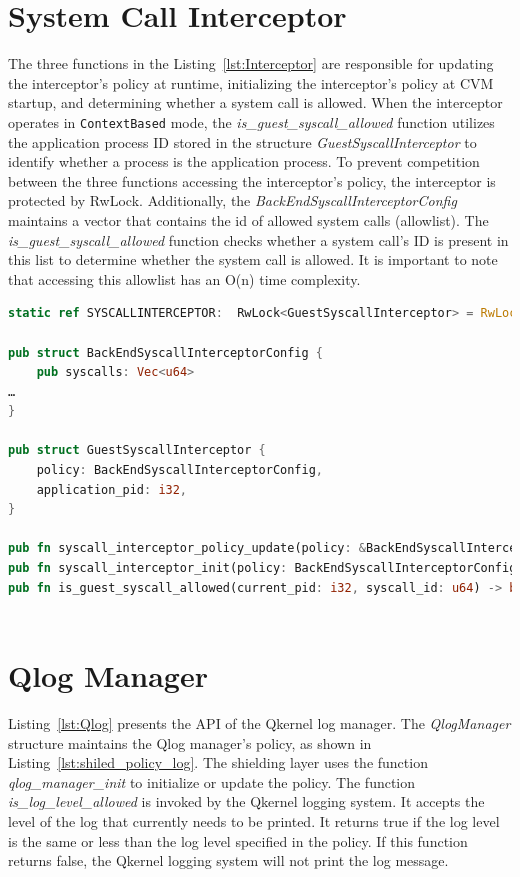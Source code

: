 \section{System Call Interceptor}
\label{sec:impl_interceptor}
The three functions in the Listing~\ref{lst:Interceptor} are responsible for updating the interceptor’s policy at runtime, initializing the interceptor’s policy at \acrshort{CVM} startup, and determining whether a system call is allowed. When the interceptor operates in \texttt{ContextBased} mode, 
the \emph{is\_guest\_syscall\_allowed} function utilizes the application process ID stored in the structure \emph{GuestSyscallInterceptor} to identify whether a process is the application process. To prevent competition between the three functions accessing the interceptor's policy, the interceptor is 
protected by RwLock. Additionally, the \emph{BackEndSyscallInterceptorConfig} maintains a vector that contains the id of allowed system calls (allowlist). The \emph{is\_guest\_syscall\_allowed} function checks whether a system call's ID is present in this list to determine whether the system call 
is allowed. It is important to note that accessing this allowlist has an O(n) time complexity.

\begin{lstlisting}[language=rust, caption= API of system call interceptor, label={lst:Interceptor}]
static ref SYSCALLINTERCEPTOR:  RwLock<GuestSyscallInterceptor> = RwLock::new(GuestSyscallInterceptor::default());

pub struct BackEndSyscallInterceptorConfig {
    pub syscalls: Vec<u64>
…
}

pub struct GuestSyscallInterceptor {
    policy: BackEndSyscallInterceptorConfig,
    application_pid: i32,
}

pub fn syscall_interceptor_policy_update(policy: &BackEndSyscallInterceptorConfig) -> Result<()> 
pub fn syscall_interceptor_init(policy: BackEndSyscallInterceptorConfig) -> Result<()> 
pub fn is_guest_syscall_allowed(current_pid: i32, syscall_id: u64) -> bool
    
\end{lstlisting}


\section{Qlog Manager}
\label{sec:iml_qlog}
Listing~\ref{lst:Qlog} presents the API of the Qkernel log manager. The \emph{QlogManager} structure maintains the Qlog manager's policy, as shown in Listing~\ref{lst:shiled_policy_log}. The shielding layer uses the function \emph{qlog\_manager\_init} to initialize or update the policy. 
The function \emph{is\_log\_level\_allowed}  is invoked by 
the Qkernel logging system. It accepts the level of the log that currently needs to be printed. It returns true if the log level is the same or less than the log level specified in the policy. If this function returns false, the Qkernel logging system will not print the log message.

